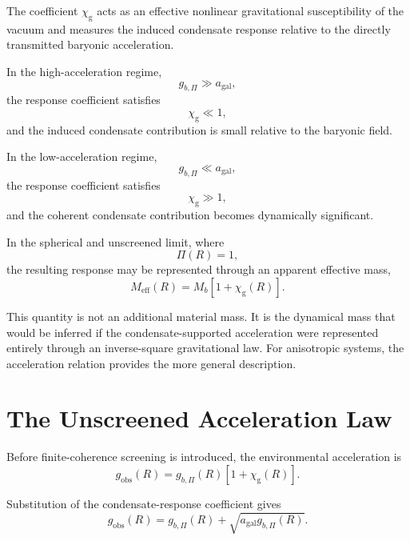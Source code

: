 The coefficient $\chi_{\mathrm{g}}$ acts as an effective nonlinear gravitational susceptibility of the vacuum and measures the induced condensate response relative to the directly transmitted baryonic acceleration.

In the high-acceleration regime,
\begin{equation}
    g_{b,\Pi} \gg a_{\mathrm{gal}},
\end{equation}
the response coefficient satisfies
\begin{equation}
    \chi_{\mathrm{g}} \ll 1,
\end{equation}
and the induced condensate contribution is small relative to the baryonic field.

In the low-acceleration regime,
\begin{equation}
    g_{b,\Pi} \ll a_{\mathrm{gal}},
\end{equation}
the response coefficient satisfies
\begin{equation}
    \chi_{\mathrm{g}} \gg 1,
\end{equation}
and the coherent condensate contribution becomes dynamically significant.

In the spherical and unscreened limit, where
\begin{equation}
    \Pi(R) = 1,
\end{equation}
the resulting response may be represented through an apparent effective mass,
\begin{equation}
    M_{\mathrm{eff}}(R) = M_b \left[ 1+\chi_{\mathrm{g}}(R) \right].
\end{equation}

This quantity is not an additional material mass. It is the dynamical mass that would be inferred if the condensate-supported acceleration were represented entirely through an inverse-square gravitational law. For anisotropic systems, the acceleration relation provides the more general description.

\section{The Unscreened Acceleration Law}

Before finite-coherence screening is introduced, the environmental acceleration is
\begin{equation}
    g_{\mathrm{obs}}(R) = g_{b,\Pi}(R) \left[ 1+\chi_{\mathrm{g}}(R) \right].
\end{equation}

Substitution of the condensate-response coefficient gives
\begin{equation}
    g_{\mathrm{obs}}(R) = g_{b,\Pi}(R) + \sqrt{ a_{\mathrm{gal}}g_{b,\Pi}(R) }.
\end{equation}

